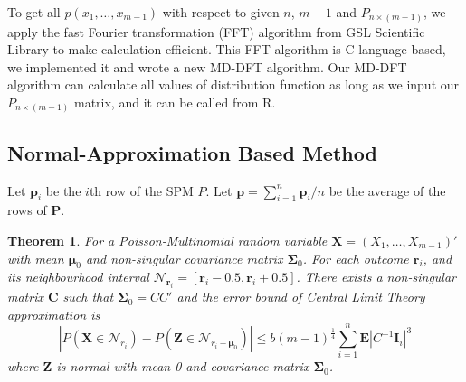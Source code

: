 \documentclass[12pt]{article}
\newcommand{\EE}{\mathbf{E}}
\newcommand{\pvec}{\boldsymbol{p}}
\newtheorem{thm}{Theorem}
\begin{document}
To get all $p(x_1,\dots,x_{m-1})$ with respect to given $n$, $m-1$ and $P_{n \times (m-1)}$, we apply the fast Fourier transformation (FFT) algorithm  from GSL Scientific Library to make calculation efficient. This FFT algorithm is C language based, we implemented it and wrote a new MD-DFT algorithm. Our MD-DFT algorithm can calculate all values of distribution function as long as we input our $P_{n\times (m-1)}$ matrix, and it can be called from R.



\subsection{Normal-Approximation Based Method}
Let $\pvec_i$ be the $i$th row of the SPM $P$. Let $\pvec=\sum_{i=1}^n\pvec_i/n$ be the average of the rows of $\boldsymbol{P}$.


\begin{thm}
For a Poisson-Multinomial random variable $\boldsymbol{X} = (X_1,\dots,X_{m-1})'$ with mean $\boldsymbol{\mu}_0$ and non-singular covariance matrix $\boldsymbol{\Sigma}_0$. For each outcome $\boldsymbol{r}_i$, and its neighbourhood interval $\mathcal{N}_{\boldsymbol{r}_i} = [\boldsymbol{r}_i-0.5,\boldsymbol{r}_i+0.5]$. There exists a non-singular matrix $\boldsymbol{C}$ such that $\boldsymbol{\Sigma}_0 = CC'$ and the error bound of Central Limit Theory approximation is
\begin{equation*}
    |P(\boldsymbol{X} \in \mathcal{N}_{r_i}) - P(\boldsymbol{Z} \in \mathcal{N}_{r_i-\boldsymbol{\mu}_0})| \leq b (m-1)^{\frac{1}{4}} \sum_{i=1}^{n}\EE|C^{-1}\boldsymbol{I}_{i}|^3
\end{equation*}
where $\boldsymbol{Z}$ is normal with mean 0 and covariance matrix $\boldsymbol{\Sigma}_0$.
\end{thm}
\end{document}
